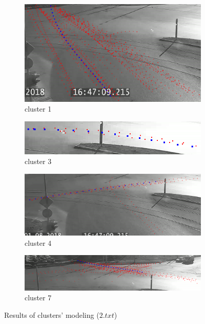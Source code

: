 \begin{figure}[!htb]
	\centering
	\begin{subfigure}[!htb]{0.7\textwidth}
		\centering{}
		\includegraphics[width=\textwidth]{images/cm-1-from-8-0_95.png}
		\caption{cluster 1}
	\end{subfigure}
	\hfill
	\begin{subfigure}[!htb]{0.7\textwidth}
		\centering{}
		\includegraphics[width=\textwidth]{images/cm-3-from-8-0_95.png}
		\caption{cluster 3}
	\end{subfigure}
	\hfill
	\begin{subfigure}[!htb]{0.7\textwidth}
		\centering{}
		\includegraphics[width=\textwidth]{images/cm-4-from-8-0_95.png}
		\caption{cluster 4}
	\end{subfigure}
	\hfill
	\begin{subfigure}[!htb]{0.7\textwidth}
		\centering{}
		\includegraphics[width=\textwidth]{images/cm-7-from-8-0_95.png}
		\caption{cluster 7}
	\end{subfigure}
	
	\caption{Results of clusters' modeling ($2.txt$)}
	\label{fig:cm-res}
\end{figure}

